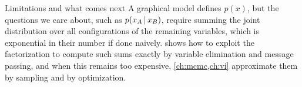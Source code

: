 \begin{notebox}{Limitations and what comes next}
A graphical model defines $p(x)$, but the questions we care about, such as $p(x_A\,|\, x_B)$, require summing the joint distribution over all configurations of the remaining variables, which is exponential in their number if done naively.  shows how to exploit the factorization to compute such sums exactly by variable elimination and message passing, and when this remains too expensive, \cref{ch:mcmc,ch:vi} approximate them by sampling and by optimization.
\end{notebox}
